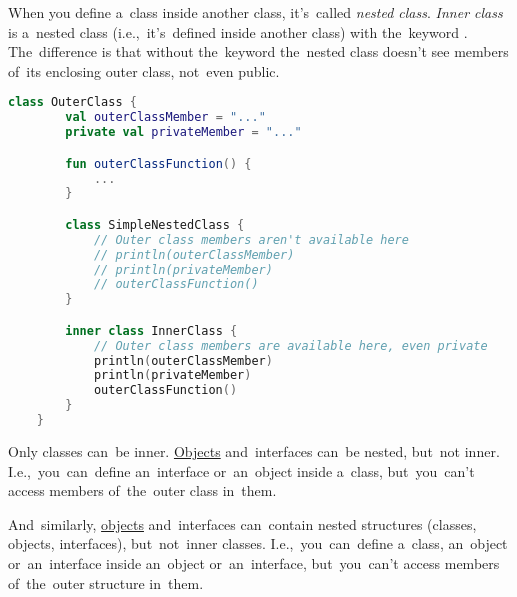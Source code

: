 \label{kotlininnerclass}
When you define a~class inside another class, it's~called \textit{nested class}.
\textit{Inner class} is a~nested class (i.e.,~it's~defined inside another class) with the~keyword .
The~difference is that without the~keyword the~nested class doesn't see members of~its enclosing outer class, not~even public.

\begin{lstlisting}[language=Kotlin]
    class OuterClass {
        val outerClassMember = "..."
        private val privateMember = "..."

        fun outerClassFunction() {
            ...
        }

        class SimpleNestedClass {
            // Outer class members aren't available here
            // println(outerClassMember)
            // println(privateMember)
            // outerClassFunction()
        }

        inner class InnerClass {
            // Outer class members are available here, even private
            println(outerClassMember)
            println(privateMember)
            outerClassFunction()
        }
    }
\end{lstlisting}
\newline

\noindent Only classes can~be inner.
\hyperref[kotlinobject]{Objects} and~interfaces can~be nested, but~not inner.
I.e.,~you~can~define an~interface or~an~object inside a~class, but~you~can't access members of~the~outer class in~them.

And~similarly, \hyperref[kotlinobject]{objects} and~interfaces can~contain nested structures (classes, objects, interfaces), but~not~inner classes.
I.e.,~you~can~define a~class, an~object or~an~interface inside an~object or~an~interface,  but~you~can't access members of~the~outer structure in~them.
\newpage
